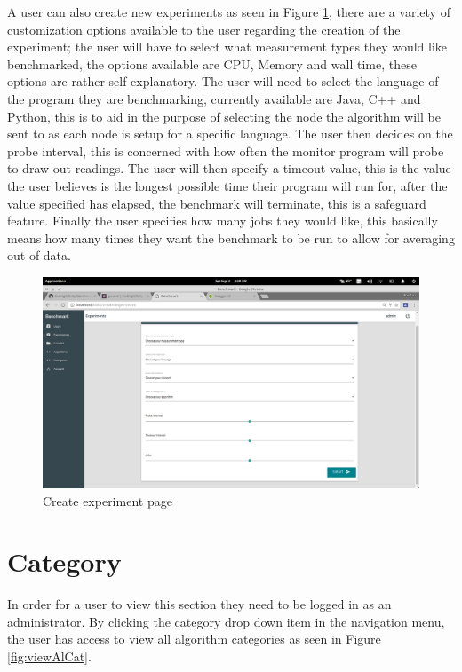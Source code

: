 \documentclass[11pt,a4paper]{article}
\begin{document}
\clearpage
A user can also create new experiments as seen in Figure \ref{fig:createExperiment}, 
there are a variety of customization options available to the user regarding the creation
of the experiment; the user will have to select what measurement types they would like 
benchmarked, the options available are CPU, Memory and wall time, these options are rather
self-explanatory. The user will need to select the language of the program they are 
benchmarking, currently available are Java, C++ and Python, this is to aid in the purpose
of selecting the node the algorithm will be sent to as each node is setup for a specific language.
The user then decides on the probe interval, this is concerned with how often the monitor
program will probe to draw out readings. The user will then specify a timeout value, this is the value
the user believes is the longest possible time their program will run for, after the value
specified has elapsed, the benchmark will terminate, this is a safeguard feature. Finally 
the user specifies how many jobs they would like, this basically means how many times they
want the benchmark to be run to allow for averaging out of data.
\begin{figure}[H]
	\begin{center}
		\includegraphics[scale=0.3]{../Images/User Manual/Create Experiment.png}
		\caption{Create experiment page}
		\label{fig:createExperiment}
	\end{center}  
\end{figure}

\clearpage
\section{Category}
In order for a user to view this section they need to be logged in as an administrator.
By clicking the category drop down item in the navigation menu, the user has access to
view all algorithm categories as seen in Figure \ref{fig:viewAlCat}.
\end{document}
